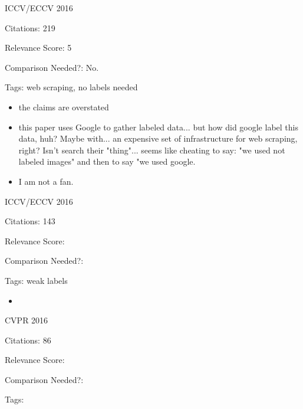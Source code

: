 \documentclass[11pt]{article}
\begin{document}
\noindent ICCV/ECCV 2016

\noindent Citations: 219

\noindent Relevance Score: 5

\noindent Comparison Needed?: No.

\noindent Tags: web scraping, no labels needed

\begin{itemize}
\item the claims are overstated
\item this paper uses Google to gather labeled data... but how did google label this data, huh? Maybe with... an expensive set of infrastructure for web scraping, right? Isn't search their "thing"... seems like cheating to say: "we used not labeled images" and then to say "we used google.
\item I am not a fan.
\end{itemize}

\vspace{2cm}

\noindent ICCV/ECCV 2016

\noindent Citations: 143

\noindent Relevance Score:

\noindent Comparison Needed?: 

\noindent Tags: weak labels

\begin{itemize}
\item 
\end{itemize}

\vspace{2cm}

\noindent CVPR 2016

\noindent Citations: 86

\noindent Relevance Score:

\noindent Comparison Needed?: 

\noindent Tags:
\end{document}
